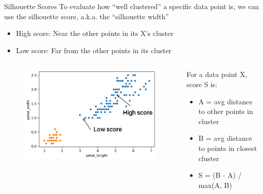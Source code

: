 \documentclass[aspectratio=169]{../latex_main/tntbeamer}  %
\begin{document}
	\begin{frame}{Silhouette Scores}
	    To evaluate how “well clustered” a specific data point is, we can use the silhouette score, a.k.a. the “silhouette width” 
	    \begin{itemize}
	        \item High score: Near the other points in its X’s cluster
	        \item Low score: Far from the other points in its cluster
	    \end{itemize}
	    \begin{columns}
	        \begin{column}{.5\textwidth}
	                \begin{figure}
	                    \centering
	                    \includegraphics[scale=.35]{Bild57}
	                \end{figure}
	        \end{column}
	        
	        
	        \begin{column}{.5\textwidth}
	                For a data point X, score S is:
	                \begin{itemize}
	                    \item A = avg distance to other points in cluster
	                    \item B = avg distance to points in closest cluster
	                    \item S = (B - A) / max(A, B)
	                \end{itemize}
	        \end{column}
	        
	        
	    \end{columns}
	\end{frame}
	
\end{document}
